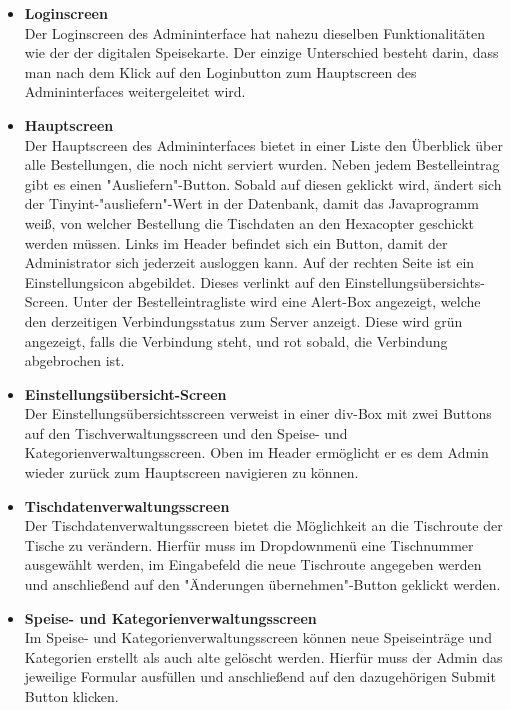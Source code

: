 \begin{itemize}
    \item \textbf{Loginscreen}\\
Der Loginscreen des Admininterface hat nahezu dieselben Funktionalitäten wie der der digitalen Speisekarte. Der einzige Unterschied besteht darin, dass man nach dem Klick auf den Loginbutton zum Hauptscreen des Admininterfaces weitergeleitet wird.
    \item \textbf{Hauptscreen}\\
Der Hauptscreen des Admininterfaces bietet in einer Liste den Überblick über alle Bestellungen, die noch nicht serviert wurden. 
Neben jedem Bestelleintrag gibt es einen "Ausliefern"-Button. Sobald auf diesen geklickt wird, ändert sich der Tinyint-"ausliefern"-Wert in der Datenbank, damit das Javaprogramm weiß, von welcher Bestellung die Tischdaten an den Hexacopter geschickt werden müssen.
Links im Header befindet sich ein Button, damit der Administrator sich jederzeit ausloggen kann.
Auf der rechten Seite ist ein Einstellungsicon abgebildet. Dieses verlinkt auf den Einstellungsübersichts-Screen.
Unter der Bestelleintragliste wird eine Alert-Box angezeigt, welche den derzeitigen Verbindungsstatus zum Server anzeigt. Diese wird grün angezeigt, falls die Verbindung steht, und rot sobald, die Verbindung abgebrochen ist.
    \item \textbf{Einstellungsübersicht-Screen}\\
Der Einstellungsübersichtsscreen verweist in einer div-Box mit zwei Buttons auf den Tischverwaltungsscreen und den Speise- und Kategorienverwaltungsscreen.
Oben im Header ermöglicht er es dem Admin wieder zurück zum Hauptscreen navigieren zu können.
    \item \textbf{Tischdatenverwaltungsscreen}\\
Der Tischdatenverwaltungsscreen bietet die Möglichkeit an die Tischroute der Tische zu verändern. Hierfür muss im Dropdownmenü eine Tischnummer ausgewählt werden, im Eingabefeld die neue Tischroute angegeben werden und anschließend auf den "Änderungen übernehmen"-Button geklickt werden.
    \item \textbf{Speise- und Kategorienverwaltungsscreen}\\
Im Speise- und Kategorienverwaltungsscreen können neue Speiseinträge und Kategorien erstellt als auch alte gelöscht werden.      
Hierfür muss der Admin das jeweilige Formular ausfüllen und anschließend auf den dazugehörigen Submit Button klicken.
  \end{itemize} 
